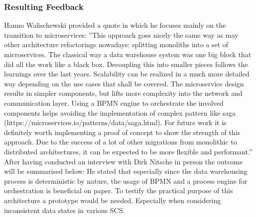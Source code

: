 \subsubsection{Resulting Feedback}
Hanno Walischewski provided a quote in which he focuses mainly on the transition to microservices:\newline
''This approach goes nicely the same way as may other architecture refactorings nowadays: splitting monoliths into a set of microservices. The classical way a data warehouse system was one big block that did all the work like a black box. Decoupling this into smaller pieces follows the learnings over the last years. Scalability can be realized in a much more detailed way depending on the use cases that shall be covered.\newline
The microservice design results in simpler components, but lifts more complexity into the network and communication layer. Using a BPMN engine to orchestrate the involved components helps avoiding the implementation of complex pattern like saga (https://microservices.io/patterns/data/saga.html).\newline
For future work it is definitely worth implementing a proof of concept to show the strength of  this approach. Due to the success of a lot of other migrations from monolithic to distributed architectures, it can be expected to be more flexible and performant.'' \cite{hanno}\newline
\\
After having conducted an interview with Dirk Nitsche in person the outcome will be summarised below:\newline
He stated that especially since the data warehousing process is deterministic by nature, the usage of BPMN and a process engine for orchestration is beneficial on paper. To testify the practical purpose of this architecture a prototype would be needed. Especially when considering inconsistent data states in various SCS. 
\cite{dirk}\newline
